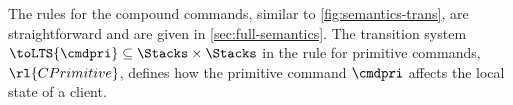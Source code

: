 

The rules for the compound commands, similar to \cref{fig:semantics-trans}, are straightforward and are given in \cref{sec:full-semantics}.
The transition system $\toLTS{\cmdpri} \subseteq \Stacks \times \Stacks$ in the rule for primitive commands, $\rl{CPrimitive}$, 
defines how the primitive command $\cmdpri$ affects the local state of a client.

